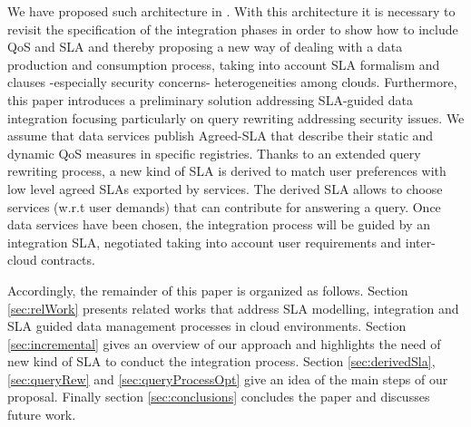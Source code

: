   
We have proposed such architecture in \cite{BennaniGMV14}. With this architecture it is necessary to revisit the specification of the integration phases in order to show how to include QoS and SLA and thereby proposing a new way of dealing with a data production and consumption process, taking into account SLA formalism and clauses -especially security concerns-  heterogeneities among clouds. Furthermore, this paper introduces a preliminary solution addressing SLA-guided data integration focusing particularly on query rewriting addressing security issues. We assume that data services publish Agreed-SLA that describe their  static and dynamic QoS measures in specific registries.  Thanks to an extended query rewriting process, a new kind of SLA is derived to match user preferences with low level agreed SLAs exported by services. The derived SLA allows to choose  services (w.r.t user demands) that can contribute for answering a query. Once data services have been chosen, the integration process will be guided by an integration SLA, negotiated taking into account user requirements and inter-cloud contracts.

 
 
Accordingly, the remainder of this paper is organized as follows. Section \ref{sec:relWork} presents related works that address SLA modelling, integration and SLA guided data management processes in cloud environments. Section \ref{sec:incremental} gives an overview of our approach and highlights the need of new kind of SLA to conduct the integration process. Section \ref{sec:derivedSla}, \ref{sec:queryRew} and \ref{sec:queryProcessOpt} give an idea of the main steps of our proposal.  Finally section  \ref{sec:conclusions} concludes the paper and discusses future work.









 